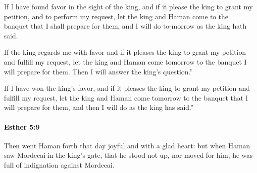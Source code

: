 			\begin{versebox}
					\item[BHS] 
					\item[LXX] 
					\item[ASV] If I have found favor in the sight of the king, and if it please the king to grant my petition, and to perform my request, let the king and Haman come to the banquet that I shall prepare for them, and I will do to-morrow as the king hath said.
					\item[NIV] If the king regards me with favor and if it pleases the king to grant my petition and fulfill my request, let the king and Haman come tomorrow to the banquet I will prepare for them. Then I will answer the king’s question.”
					\item[NRSV] If I have won the king’s favor, and if it pleases the king to grant my petition and fulfill my request, let the king and Haman come tomorrow to the banquet that I will prepare for them, and then I will do as the king has said.”
			\end{versebox}

		\paragraph{Esther 5:9} %
			\label{ESTHER-5-9}

			Then went Haman forth that day joyful and with a glad heart: but when Haman saw Mordecai in the king’s gate, that he stood not up, nor moved for him, he was full of indignation against Mordecai.

